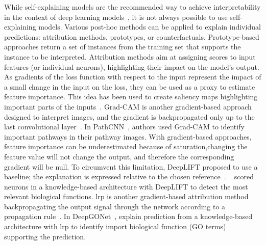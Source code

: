\documentclass[../main.tex]{subfiles}
\begin{document}
	While self-explaining models are the recommended way to achieve interpretability in the context of deep learning models~\cite{Rudin2019}, it is not always possible to use self-explaining models.
	Various post-hoc methods can be applied to explain individual predictions: attribution methods, prototypes, or counterfactuals.
	Prototype-based approaches return a set of instances from the training set that supports the instance to be interpreted.
	Attribution methods aim at assigning scores to input features (or individual neurons), highlighting their impact on the model's output.
	As gradients of the loss function with respect to the input represent the impact of a small change in the input on the loss, they can be used as a proxy to estimate feature importance.
	This idea has been used to create saliency maps highlighting important parts of the inputs~\cite{intGrad}.
	Grad-CAM is another gradient-based approach designed to interpret images, and the gradient is backpropagated only up to the last convolutional layer~\cite{GradCAM}.
	In PathCNN~\cite{PathCNN}, authors used Grad-CAM to identify important pathways in their pathway images.
	With gradient-based approaches, feature importance can be underestimated because of saturation,\ie{}changing the feature value will not change the output, and therefore the corresponding gradient will be null.
	To circumvent this limitation, DeepLIFT proposed to use a baseline; the explanation is expressed relative to the chosen reference~\cite{DeepLIFT}.
	\citeauthor{PNet}~\cite{PNet} scored neurons in a knowledge-based architecture with DeepLIFT to detect the most relevant biological functions.
	\Gls{lrp} is another gradient-based attribution method backpropagating the output signal through the network according to a propagation rule~\cite{LRP}.
	In DeepGONet~\cite{bourgeaisDeepGONetSelfexplainable2021}, \citeauthor{bourgeaisDeepGONetSelfexplainable2021} explain prediction from a knowledge-based architecture with \gls{lrp} to identify import biological function (GO terms)
	supporting the prediction.
\end{document}
